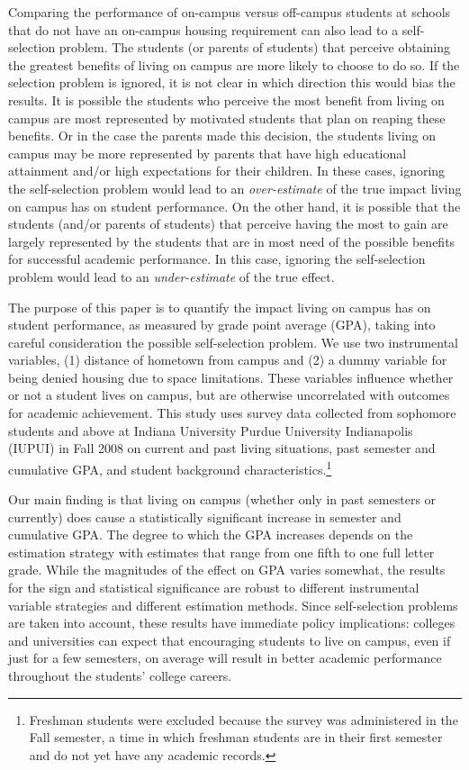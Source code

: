 \documentclass[12pt]{article}
\begin{document}
Comparing the performance of on-campus versus off-campus students at schools that do not have an on-campus housing requirement can also lead to a self-selection problem.  The students (or parents of students) that perceive obtaining the greatest benefits of living on campus are more likely to choose to do so.  If the selection problem is ignored, it is not clear in which direction this would bias the results.  It is possible the students who perceive the most benefit from living on campus are most represented by motivated students that plan on reaping these benefits.  Or in the case the parents made this decision, the students living on campus may be more represented by parents that have high educational attainment and/or high expectations for their children.  In these cases, ignoring the self-selection problem would lead to an \textit{over-estimate} of the true impact living on campus has on student performance.  On the other hand, it is possible that the students (and/or parents of students) that perceive having the most to gain are largely represented by the students that are in most need of the possible benefits for successful academic performance.  In this case, ignoring the self-selection problem would lead to an \textit{under-estimate} of the true effect.

The purpose of this paper is to quantify the impact living on campus has on student performance, as measured by grade point average (GPA), taking into careful consideration the possible self-selection problem.  We use two instrumental variables, (1) distance of hometown from campus and (2) a dummy variable for being denied housing due to space limitations.  These variables influence whether or not a student lives on campus, but are otherwise uncorrelated with outcomes for academic achievement.  This study uses survey data collected from sophomore students and above at Indiana University Purdue University Indianapolis (IUPUI) in Fall 2008 on current and past living situations, past semester and cumulative GPA, and student background characteristics.\footnote{Freshman students were excluded because the survey was administered in the Fall semester, a time in which freshman students are in their first semester and do not yet have any academic records.}

Our main finding is that living on campus (whether only in past semesters or currently) does cause a statistically significant increase in semester and cumulative GPA.  The degree to which the GPA increases depends on the estimation strategy with estimates that range from one fifth to one full letter grade.  While the magnitudes of the effect on GPA varies somewhat, the results for the sign and statistical significance are robust to different instrumental variable strategies and different estimation methods.  Since self-selection problems are taken into account, these results have immediate policy implications: colleges and universities can expect that encouraging students to live on campus, even if just for a few semesters, on average will result in better academic performance throughout the students' college careers. 
\end{document}

